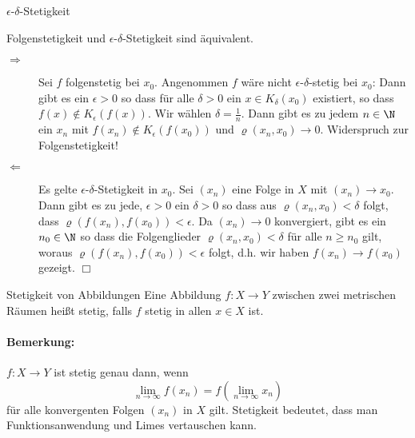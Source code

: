 \begin{definition}{$\epsilon$-$\delta$-Stetigkeit}
\begin{multicols}{2}
\end{multicols}
\end{definition}





\begin{satz}{}
	Folgenstetigkeit und $\epsilon$-$\delta$-Stetigkeit sind äquivalent.
\end{satz}
\beweis
\begin{description}
	\item[\glqq$\Rightarrow$\grqq] Sei $f$ folgenstetig bei $x_0$. Angenommen $f$ wäre nicht $\epsilon$-$\delta$-stetig bei $x_0$:
	Dann gibt es ein $\epsilon>0$ so dass für alle $\delta>0$ ein $x\in K_\delta(x_0)$ existiert, so dass $f(x)\not\in K_\epsilon(f(x))$.
	Wir wählen $\delta=\frac1n$. Dann gibt es zu jedem $n\in\N$ ein $x_n$ mit $f(x_n)\not\in K_\epsilon(f(x_0))$ und $\varrho(x_n,x_0)\to 0$. Widerspruch zur Folgenstetigkeit!
	\item[\glqq$\Leftarrow$\grqq] Es gelte $\epsilon$-$\delta$-Stetigkeit in $x_0$.
	Sei $(x_n)$ eine Folge in $X$ mit $(x_n)\to x_0$.
	Dann gibt es zu jede, $\epsilon>0$ ein $\delta>0$ so dass aus $\varrho(x_n,x_0)<\delta$ folgt, dass $\varrho(f(x_n),f(x_0))<\epsilon$.
	Da $(x_n)\to 0$ konvergiert, gibt es ein $n_0\in\N$ so dass die Folgenglieder $\varrho(x_n,x_0)<\delta$ für alle $n\geq n_0$ gilt, woraus $\varrho(f(x_n),f(x_0))<\epsilon$ folgt, d.h. wir haben $f(x_n)\to f(x_0)$ gezeigt.
	\hfill$\Box$
\end{description}

\begin{definition}{Stetigkeit von Abbildungen}
	Eine Abbildung $f:X\rightarrow Y$ zwischen zwei metrischen Räumen heißt stetig, falls $f$ stetig in allen $x\in X$ ist.
\end{definition}

\paragraph{Bemerkung:}
$f:X\rightarrow Y$ ist stetig genau dann, wenn
\begin{equation*}
	\lim\limits_{n\to\infty}f(x_n)=f(\lim\limits_{n\to\infty}x_n)
\end{equation*}
für alle konvergenten Folgen $(x_n)$ in $X$ gilt.
Stetigkeit bedeutet, dass man Funktionsanwendung und Limes vertauschen kann.

